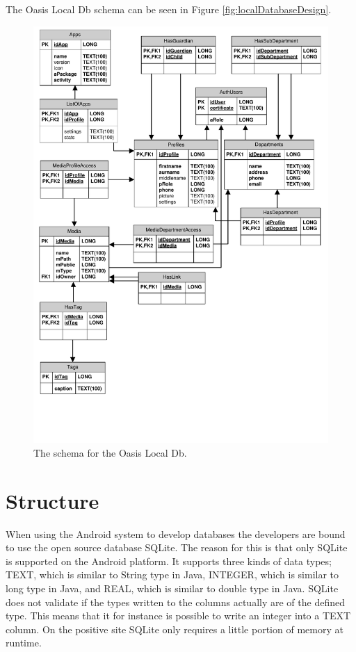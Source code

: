The Oasis Local Db schema can be seen in Figure \vref{fig:localDatabaseDesign}.

\begin{figure}[H]
	\centering
		\includegraphics[width=\textwidth]{Images/LocalDatabaseDesign}
	\caption{The schema for the Oasis Local Db.}
	\label{fig:localDatabaseDesign}
\end{figure}

\section{Structure}
\label{sec:OasisStructure}
When using the Android system to develop databases the developers are bound to use the open source database SQLite. \cite{SQLite}
The reason for this is that only SQLite is supported on the Android platform. \cite{AndroidArchitecture}
It supports three kinds of data types; TEXT, which is similar to String type in Java, INTEGER, which is similar to long type in Java, and REAL, which is similar to double type in Java. \cite{SQLTypes}
SQLite does not validate if the types written to the columns actually are of the defined type.
This means that it for instance is possible to write an integer into a TEXT column.
On the positive site SQLite only requires a little portion of memory at runtime. \cite{SQLAbout} 

